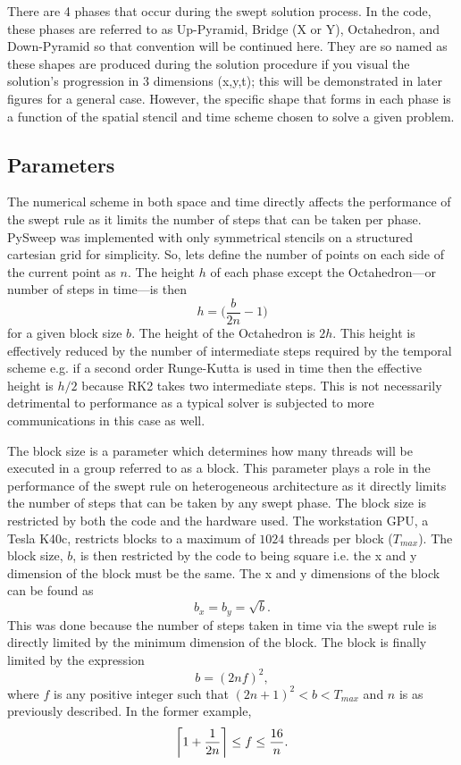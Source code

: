 \documentclass[review]{elsarticle}
\DeclarePairedDelimiter{\ceil}{\lceil}{\rceil}
\begin{document}
\par
There are 4 phases that occur during the swept solution process. In the code, these phases are referred to as Up-Pyramid, Bridge (X or Y), Octahedron, and Down-Pyramid so that convention will be continued here. They are so named as these shapes are produced during the solution procedure if you visual the solution's progression in 3 dimensions (x,y,t); this will be demonstrated in later figures for a general case. However, the specific shape that forms in each phase is a function of the spatial stencil and time scheme chosen to solve a given problem.  

\subsection{Parameters}
\par
The numerical scheme in both space and time directly affects the performance of the swept rule as it limits the number of steps that can be taken per phase. PySweep was implemented with only symmetrical stencils on a structured cartesian grid for simplicity. So, lets define the number of points on each side of the current point as $n$. The height $h$ of each phase except the Octahedron---or number of steps in time---is then
\begin{equation}
    h = \bigg(\frac{b}{2n}-1\bigg)
\end{equation}
for a given block size $b$. The height of the Octahedron is $2h$. This height is effectively reduced by the number of intermediate steps required by the temporal scheme e.g. if a second order Runge-Kutta is used in time then the effective height is $h/2$ because RK2 takes two intermediate steps. This is not necessarily detrimental to performance as a typical solver is subjected to more communications in this case as well.

\par
The block size is a parameter which determines how many threads will be executed in a group referred to as a block. This parameter plays a role in the performance of the swept rule on heterogeneous architecture as it directly limits the number of steps that can be taken by any swept phase. The block size is restricted by both the code and the hardware used. The workstation GPU, a Tesla K40c, restricts blocks to a maximum of $1024$ threads per block ($T_{max}$).
The block size, $b$, is then restricted by the code to being square i.e. the x and y dimension of the block must be the same. The x and y dimensions of the block can be found as
\begin{equation}
    b_x = b_y = \sqrt{b}.
\end{equation}
This was done because the number of steps taken in time via the swept rule is directly limited by the minimum dimension of the block. The block is finally limited by the expression
\begin{equation}
    b  = (2nf)^2,
\end{equation}
where $f$ is any positive integer such that $(2n+1)^2 < b < T_{max}$ and $n$ is as previously described. In the former example,
\begin{equation}
  \ceil[\bigg]{1+\frac{1}{2n}} \leq f \leq \frac{16}{n}.
\end{equation}
\end{document}
